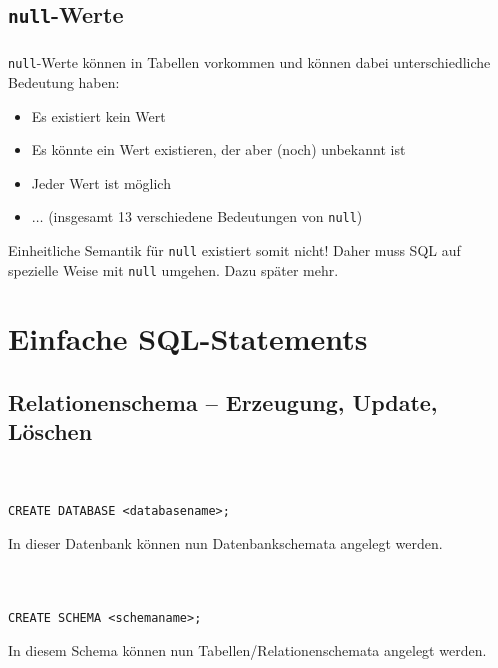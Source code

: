 \subsection{\texttt{null}-Werte}

\begin{frame}[t]\frametitle{\insertsection}
\framesubtitle{\insertsubsection}
\onslide
\texttt{null}-Werte k\"onnen in Tabellen vorkommen und k\"onnen dabei unterschiedliche Bedeutung haben:
\begin{itemize}
	\item Es existiert kein Wert
	\item Es k\"onnte ein Wert existieren, der aber (noch) unbekannt ist
	\item Jeder Wert ist m\"oglich
	\item $\dots$ (insgesamt 13 verschiedene Bedeutungen von \texttt{null})
\end{itemize}
\abs
\pause
\alert{Einheitliche Semantik für \texttt{null} existiert somit nicht! 
Daher muss SQL auf spezielle Weise mit \texttt{null} umgehen. Dazu sp\"ater mehr.}
\end{frame}

\section{Einfache SQL-Statements}
\subsection{Relationenschema -- Erzeugung, Update, L\"oschen}

\begin{frame}[fragile]
\frametitle{\insertsection}
\framesubtitle{\insertsubsection}
\\[4pt]
\lstset{language=sql}
\begin{lstlisting}[numbers=none]
CREATE DATABASE <databasename>;
\end{lstlisting}
\abs
In dieser Datenbank k\"onnen nun Datenbankschemata angelegt werden.
\abs\ \abs\ \abs 
{}
\end{frame}

\begin{frame}[fragile]
\frametitle{\insertsection}
\framesubtitle{\insertsubsection}
\\[4pt]
\lstset{language=sql}
\begin{lstlisting}[numbers=none]
CREATE SCHEMA <schemaname>;
\end{lstlisting}
\abs
In diesem Schema k\"onnen nun Tabellen/Relationenschemata angelegt werden.
\abs\ \abs\ \abs 
{}
\end{frame}

